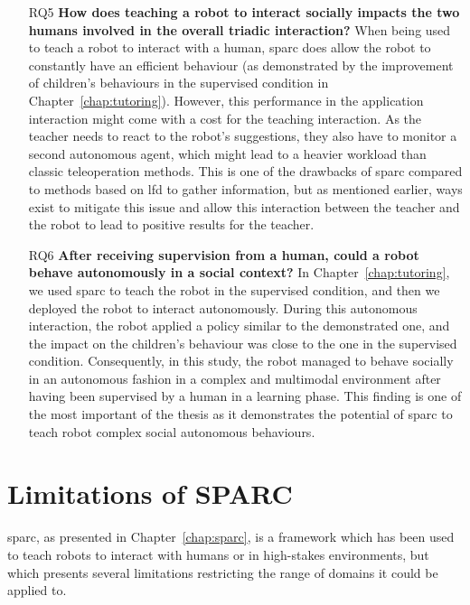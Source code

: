 \begin{itemize}
	\item [RQ5] \textbf{How does teaching a robot to interact socially impacts the two humans involved in the overall triadic interaction?}
	When being used to teach a robot to interact with a human, \gls{sparc} does allow the robot to constantly have an efficient behaviour (as demonstrated by the improvement of children's behaviours in the supervised condition in Chapter~\ref{chap:tutoring}). However, this performance in the application interaction might come with a cost for the teaching interaction. As the teacher needs to react to the robot's suggestions, they also have to monitor a second autonomous agent, which might lead to a heavier workload than classic teleoperation methods. This is one of the drawbacks of \gls{sparc} compared to methods based on \gls{lfd} to gather information, but as mentioned earlier, ways exist to mitigate this issue and allow this interaction between the teacher and the robot to lead to positive results for the teacher.
	
	\item [RQ6] \textbf{After receiving supervision from a human, could a robot behave autonomously in a social context?}
	In Chapter~\ref{chap:tutoring}, we used \gls{sparc} to teach the robot in the supervised condition, and then we deployed the robot to interact autonomously. During this autonomous interaction, the robot applied a policy similar to the demonstrated one, and the impact on the children's behaviour was close to the one in the supervised condition. Consequently, in this study, the robot managed to behave socially in an autonomous fashion in a complex and multimodal environment after having been supervised by a human in a learning phase. This finding is one of the most important of the thesis as it demonstrates the potential of \gls{sparc} to teach robot complex social autonomous behaviours.
\end{itemize}

\section{Limitations of SPARC} \label{sec:disc_limitations}

\gls{sparc}, as presented in Chapter~\ref{chap:sparc}, is a framework which has been used to teach robots to interact with humans or in high-stakes environments, but which presents several limitations restricting the range of domains it could be applied to.


